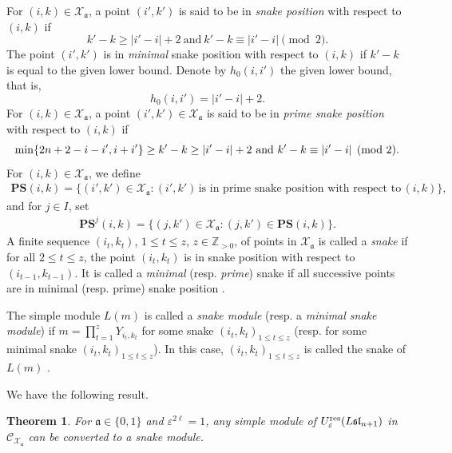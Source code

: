 \documentclass[12pt, reqno]{amsart}
\newtheorem{theorem}{Theorem}[section]
\numberwithin{equation}{section}
\newcommand{\res}{{\rm res}}
\begin{document}
{For $(i,k) \in \mathcal{X}_{\mathfrak{a}}$, a point $(i',k')$ is said to be in \textit{snake position} with respect to $(i,k)$ if
\[
k'-k \geq |i'-i|+2 \ \text{and} \  k'-k \equiv |i'-i|\pmod 2.
\]
The point $(i',k')$ is in \textit{minimal} snake position with respect to $(i,k)$ if $k'-k$ is equal to the given lower bound. Denote by $h_{0}(i,i')$ the given lower bound, that is,
\[
h_{0}(i,i')=|i'-i|+2.
\]
For $(i,k) \in \mathcal{X}_{\mathfrak{a}}$, a point $(i',k') \in \mathcal{X}_{\mathfrak{a}}$ is said to be in \textit{prime snake position} with respect to $(i,k)$ if
\[
\min \{ 2n+2-i-i', i+i' \} \geq k'-k \geq |i'-i|+2 \ \text{and} \  k'-k \equiv |i'-i| \pmod 2.  \\
\]
For $(i,k) \in \mathcal{X}_{\mathfrak{a}}$, we define
\begin{align}\label{Prime snake}
\mathbf{PS}(i,k)=\{(i',k') \in \mathcal{X}_{\mathfrak{a}}: (i',k')\, \text{is in prime snake position with respect to}\,(i,k)\},
\end{align}
and for $j\in I$, set
\begin{align}\label{Prime snake 2}
\mathbf{PS}^{j}(i,k)=\{(j,k') \in \mathcal{X}_{\mathfrak{a}}: (j,k') \in \mathbf{PS}(i,k)\}.
\end{align}
A finite sequence $(i_{t},k_{t})$, $1 \leq t \leq z$, $z \in \mathbb{Z}_{>0}$, of points in $\mathcal{X}_{\mathfrak{a}}$ is called a \textit{snake} if for all $2 \leq t \leq z$, the point $(i_{t},k_{t})$ is in snake position with respect to $(i_{t-1},k_{t-1})$. It is called a \textit{minimal} (resp. \textit{prime}) snake if all successive points are in minimal (resp. prime) snake position \cite[Section 4]{MY12a}.

The simple module $L(m)$ is called a \textit{snake module} (resp. a \textit{minimal snake module}) if $m=\prod_{t=1}^{z} Y_{i_{t},k_{t}}$ for some snake $(i_{t},k_{t})_{1 \leq t \leq z}$ (resp. for some minimal snake $(i_{t},k_{t})_{1 \leq t \leq z}$). In this case, $(i_{t},k_{t})_{1 \leq t \leq z}$ is called the snake of $L(m)$ \cite[Section 4]{MY12a}.

We have the following result.
\begin{theorem}\label{Th:simple modules are snake modules}
For $\mathfrak{a} \in \{0,1\}$ and $\varepsilon^{2\ell}=1$, any simple module of $U_{\varepsilon}^{\res}({L\mathfrak{sl}_{n+1}})$ in $\mathcal{C}_{\mathcal{X}_{\mathfrak{a}}}$ can be converted to a snake module.
\end{theorem}

}
\end{document}
